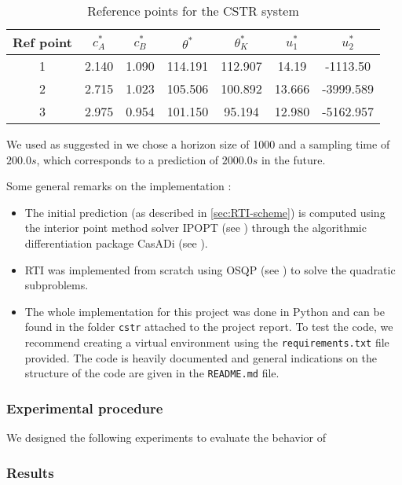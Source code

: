 \documentclass[12pt]{article}
\begin{document}
\begin{table}[H]
	\centering
	\begin{tabular}{|c|c|c|c|c|c|c|}
		\hline
		Ref point & $c_A^*$ & $c_B^*$ & $\theta^*$ & $\theta_K^*$ & $u_1^*$ & $u_2^*$ \\
		\hline
		1 & 2.140 & 1.090 & 114.191 & 112.907 & 14.19 & -1113.50 \\
		\hline
		2 & 2.715 & 1.023 & 105.506 & 100.892 & 13.666 & -3999.589 \\
		\hline
		3 & 2.975 &  0.954 & 101.150 & 95.194 & 12.980 & -5162.957 \\
		\hline
	\end{tabular}
	\caption{Reference points for the CSTR system}
	\label{tab:CSTR-ref-points}
\end{table}

We used as suggested in \cite{diehl-dissertation} we chose a horizon size of 1000 and a sampling time of $200.0s$, which corresponds to a prediction of $2000.0s$ in the future.

Some general remarks on the implementation :
\begin{itemize}[label=\textbullet]
	\item The initial prediction (as described in \ref{sec:RTI-scheme}) is computed using the interior point method solver IPOPT (see \cite{ipopt}) through the algorithmic differentiation package CasADi (see \cite{casadi}).

	\item RTI was implemented from scratch using OSQP (see \cite{osqp}) to solve the quadratic subproblems.

	\item The whole implementation for this project was done in Python and can be found in the folder \verb|cstr| attached to the project report.
	To test the code, we recommend creating a virtual environment using the \verb|requirements.txt| file provided.
	The code is heavily documented and general indications on the structure of the code are given in the \verb|README.md| file.
\end{itemize}

\subsubsection*{Experimental procedure}

We designed the following experiments to evaluate the behavior of

\subsubsection*{Results}
\end{document}
